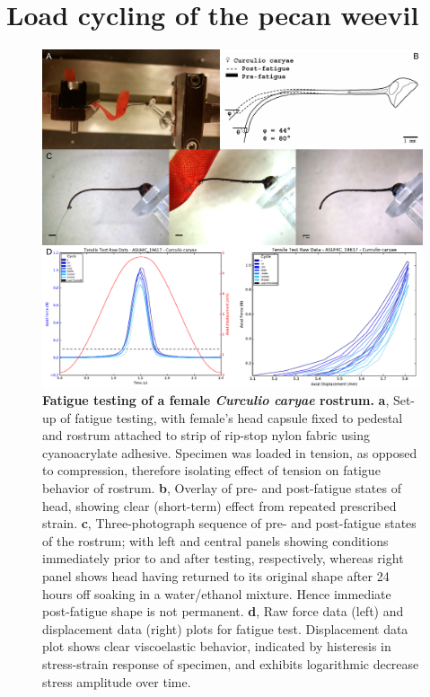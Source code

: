 \documentclass[twocolumn, linenumbers, superscriptaddress, nofootinbib]{revtex4-1}
\begin{document}
	\section{Load cycling of the pecan weevil}
		
		\begin{figure}
			\centering
			\includegraphics[width=180mm]{fig5.pdf}
			\caption{\textbf{Fatigue testing of a female \textit{Curculio caryae} rostrum.}
				\textbf{a}, Set-up of fatigue testing, with female's head capsule fixed to pedestal and rostrum attached to strip of rip-stop nylon fabric using cyanoacrylate adhesive.
				Specimen was loaded in tension, as opposed to compression, therefore isolating effect of tension on fatigue behavior of rostrum.
				\textbf{b}, Overlay of pre- and post-fatigue states of head, showing clear (short-term) effect from repeated prescribed strain.
				\textbf{c}, Three-photograph sequence of pre- and post-fatigue states of the rostrum; with left and central panels showing conditions immediately prior to and after testing, respectively, whereas right panel shows head having returned to its original shape after 24 hours off soaking in a water/ethanol mixture. Hence immediate post-fatigue shape is not permanent.
				\textbf{d}, Raw force data (left) and displacement data (right) plots for fatigue test.
				Displacement data plot shows clear viscoelastic behavior, indicated by histeresis in stress-strain response of specimen, and exhibits logarithmic decrease stress amplitude over time.
			}
			\label{fig::fatigue}
		\end{figure}
		
\end{document}
